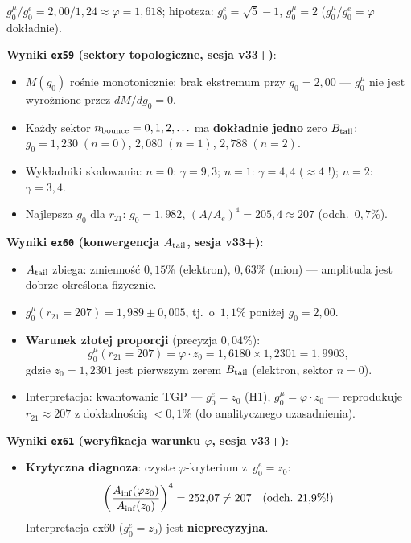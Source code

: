 \begin{remark}
\begin{itemize}[nosep]
    $g_0^\mu/g_0^e = 2{,}00/1{,}24 \approx \varphi = 1{,}618$;
    hipoteza: $g_0^e = \sqrt{5}-1$, $g_0^\mu = 2$
    ($g_0^\mu/g_0^e = \varphi$ dok\l{}adnie).
\end{itemize}
\textbf{Wyniki \texttt{ex59} (sektory topologiczne, sesja v33+)}:
\begin{itemize}[nosep]
  \item $M(g_0)$ ro\'snie monotonicznie: brak ekstremum przy $g_0 = 2{,}00$
    --- $g_0^\mu$ nie jest wyro\.znione przez $dM/dg_0 = 0$.
  \item Ka\.zdy sektor $n_{\rm bounce} = 0,1,2,\ldots$ ma \textbf{dok\l{}adnie jedno}
    zero $B_{\rm tail}$: $g_0 = 1{,}230\;(n=0)$, $2{,}080\;(n=1)$, $2{,}788\;(n=2)$.
  \item Wyk\l{}adniki skalowania: $n=0$: $\gamma=9{,}3$;
    $n=1$: $\gamma=4{,}4$ ($\approx 4$ !); $n=2$: $\gamma=3{,}4$.
  \item Najlepsza $g_0$ dla $r_{21}$: $g_0 = 1{,}982$,
    $(A/A_e)^4 = 205{,}4 \approx 207$ (odch.~$0{,}7\%$).
\end{itemize}
\textbf{Wyniki \texttt{ex60} (konwergencja $A_{\rm tail}$, sesja v33+)}:
\begin{itemize}[nosep]
  \item $A_{\rm tail}$ zbiega: zmienno\'s\'c $0{,}15\%$ (elektron), $0{,}63\%$ (mion)
    --- amplituda jest dobrze okre\'slona fizycznie.
  \item $g_0^\mu(r_{21}=207) = 1{,}989\pm0{,}005$, tj.~o~$1{,}1\%$ poni\.zej $g_0 = 2{,}00$.
  \item \textbf{Warunek z\l{}otej proporcji} (precyzja $0{,}04\%$):
    \[
      g_0^\mu(r_{21}=207)
      = \varphi \cdot z_0
      = 1{,}6180 \times 1{,}2301
      = 1{,}9903,
    \]
    gdzie $z_0 = 1{,}2301$ jest pierwszym zerem $B_{\rm tail}$ (elektron, sektor $n=0$).
  \item Interpretacja: kwantowanie TGP --- $g_0^e = z_0$ (H1), $g_0^\mu = \varphi\cdot z_0$
    --- reprodukuje $r_{21}\approx 207$ z dok\l{}adno\'sci\k{a} $< 0{,}1\%$
    (do analitycznego uzasadnienia).
\end{itemize}
\textbf{Wyniki \texttt{ex61} (weryfikacja warunku $\varphi$, sesja v33+)}:
\begin{itemize}[nosep]
  \item \textbf{Krytyczna diagnoza}: czyste $\varphi$-kryterium z~$g_0^e = z_0$:
    \[
      \left(\frac{A_{\rm inf}(\varphi z_0)}{A_{\rm inf}(z_0)}\right)^4
      = 252{,}07 \neq 207 \quad (\text{odch.~}21{,}9\%!)
    \]
    Interpretacja ex60 ($g_0^e = z_0$) jest \textbf{nieprecyzyjna}.

\end{itemize}
\end{remark}
